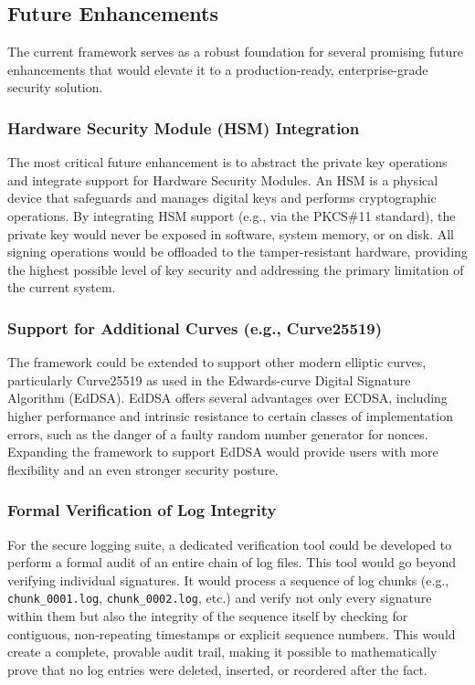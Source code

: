 \documentclass[12pt, letterpaper]{article}
\begin{document}
	\subsection{Future Enhancements}
	The current framework serves as a robust foundation for several promising future enhancements that would elevate it to a production-ready, enterprise-grade security solution.
	
	\subsubsection{Hardware Security Module (HSM) Integration}
	The most critical future enhancement is to abstract the private key operations and integrate support for Hardware Security Modules. An HSM is a physical device that safeguards and manages digital keys and performs cryptographic operations. By integrating HSM support (e.g., via the PKCS\#11 standard), the private key would never be exposed in software, system memory, or on disk. All signing operations would be offloaded to the tamper-resistant hardware, providing the highest possible level of key security and addressing the primary limitation of the current system.
	
	\subsubsection{Support for Additional Curves (e.g., Curve25519)}
	The framework could be extended to support other modern elliptic curves, particularly Curve25519 as used in the Edwards-curve Digital Signature Algorithm (EdDSA). EdDSA offers several advantages over ECDSA, including higher performance and intrinsic resistance to certain classes of implementation errors, such as the danger of a faulty random number generator for nonces. Expanding the framework to support EdDSA would provide users with more flexibility and an even stronger security posture.
		
	\subsubsection{Formal Verification of Log Integrity}
	For the secure logging suite, a dedicated verification tool could be developed to perform a formal audit of an entire chain of log files. This tool would go beyond verifying individual signatures. It would process a sequence of log chunks (e.g., \texttt{chunk\_0001.log}, \texttt{chunk\_0002.log}, etc.) and verify not only every signature within them but also the integrity of the sequence itself by checking for contiguous, non-repeating timestamps or explicit sequence numbers. This would create a complete, provable audit trail, making it possible to mathematically prove that no log entries were deleted, inserted, or reordered after the fact.
	
\end{document}
